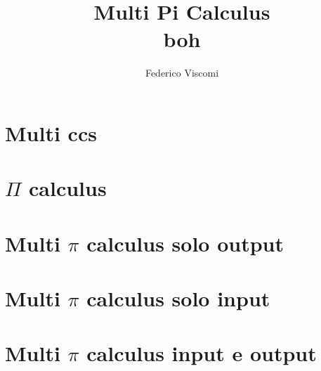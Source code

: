 \documentclass[14pt, a4paper, draft]{book}
\title{Multi Pi Calculus\\[4mm]\small{boh}}
\author{Federico Viscomi}
\newcommand{\openrigthchapter}[1]{\chapter{#1}}
\begin{document}
\pagestyle{empty}




\tableofcontents

%

\openrigthchapter{Multi ccs}
%

\openrigthchapter{$\Pi$ calculus}


\openrigthchapter{Multi $\pi$ calculus solo output}


\openrigthchapter{Multi $\pi$ calculus solo input}


\openrigthchapter{Multi $\pi$ calculus input e output}


% 


%

\printindex


\end{document}
